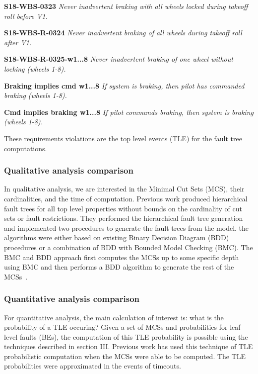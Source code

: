 \textbf{S18-WBS-0323} \textit{Never inadvertent braking with all wheels locked during takeoff roll before V1.}

\textbf{S18-WBS-R-0324} \textit{Never inadvertent braking of all wheels during takeoff roll after V1.}

\textbf{S18-WBS-R-0325-w1...8} \textit{Never inadvertent braking of one wheel without locking (wheels 1-8).} 

\textbf{Braking implies cmd w1...8} \textit{If system is braking, then pilot has commanded braking (wheels 1-8).} 

\textbf{Cmd implies braking w1...8} \textit{If pilot commands braking, then system is braking (wheels 1-8).} 

These requirements violations are the top level events (TLE) for the fault tree computations. 


\subsubsection{Qualitative analysis comparison}
In qualitative analysis, we are interested in the Minimal Cut Sets (MCS), their cardinalities, and the time of computation. Previous work produced hierarchical fault trees for all top level properties without bounds on the cardinality of cut sets or fault restrictions. They performed the hierarchical fault tree generation and implemented two procedures to generate the fault trees from the model. the algorithms were either based on existing Binary Decision Diagram (BDD) procedures or a combination of BDD with Bounded Model Checking (BMC). The BMC and BDD approach first computes the MCSs up to some specific depth using BMC and then performs a BDD algorithm to generate the rest of the MCSs~\cite{10.1007/978-3-319-11936-6-7, mattareiThesis}. 

\subsubsection{Quantitative analysis comparison}
For quantitative analysis, the main calculation of interest is: what is the probability of a TLE occuring? Given a set of MCSs and probabilities for leaf level faults (BEs), the computation of this TLE probability is possible using the techniques described in section III. Previous work has used this technique of TLE probabilistic computation when the MCSs were able to be computed. The TLE probabilities were approximated in the events of timeouts. 
